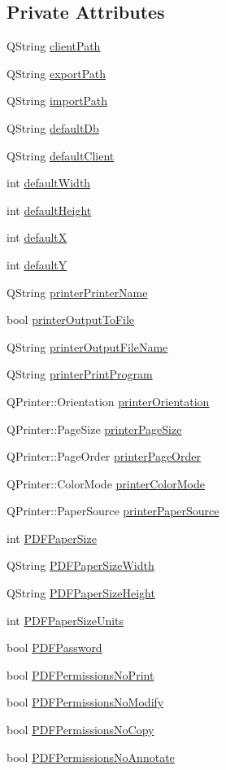 \subsection*{Private Attributes}
\begin{CompactItemize}
\item 
QString \hyperlink{classSettings_r0}{client\-Path}
\item 
QString \hyperlink{classSettings_r1}{export\-Path}
\item 
QString \hyperlink{classSettings_r2}{import\-Path}
\item 
QString \hyperlink{classSettings_r3}{default\-Db}
\item 
QString \hyperlink{classSettings_r4}{default\-Client}
\item 
int \hyperlink{classSettings_r5}{default\-Width}
\item 
int \hyperlink{classSettings_r6}{default\-Height}
\item 
int \hyperlink{classSettings_r7}{default\-X}
\item 
int \hyperlink{classSettings_r8}{default\-Y}
\item 
QString \hyperlink{classSettings_r9}{printer\-Printer\-Name}
\item 
bool \hyperlink{classSettings_r10}{printer\-Output\-To\-File}
\item 
QString \hyperlink{classSettings_r11}{printer\-Output\-File\-Name}
\item 
QString \hyperlink{classSettings_r12}{printer\-Print\-Program}
\item 
QPrinter::Orientation \hyperlink{classSettings_r13}{printer\-Orientation}
\item 
QPrinter::Page\-Size \hyperlink{classSettings_r14}{printer\-Page\-Size}
\item 
QPrinter::Page\-Order \hyperlink{classSettings_r15}{printer\-Page\-Order}
\item 
QPrinter::Color\-Mode \hyperlink{classSettings_r16}{printer\-Color\-Mode}
\item 
QPrinter::Paper\-Source \hyperlink{classSettings_r17}{printer\-Paper\-Source}
\item 
int \hyperlink{classSettings_r18}{PDFPaper\-Size}
\item 
QString \hyperlink{classSettings_r19}{PDFPaper\-Size\-Width}
\item 
QString \hyperlink{classSettings_r20}{PDFPaper\-Size\-Height}
\item 
int \hyperlink{classSettings_r21}{PDFPaper\-Size\-Units}
\item 
bool \hyperlink{classSettings_r22}{PDFPassword}
\item 
bool \hyperlink{classSettings_r23}{PDFPermissions\-No\-Print}
\item 
bool \hyperlink{classSettings_r24}{PDFPermissions\-No\-Modify}
\item 
bool \hyperlink{classSettings_r25}{PDFPermissions\-No\-Copy}
\item 
bool \hyperlink{classSettings_r26}{PDFPermissions\-No\-Annotate}
\end{CompactItemize}
